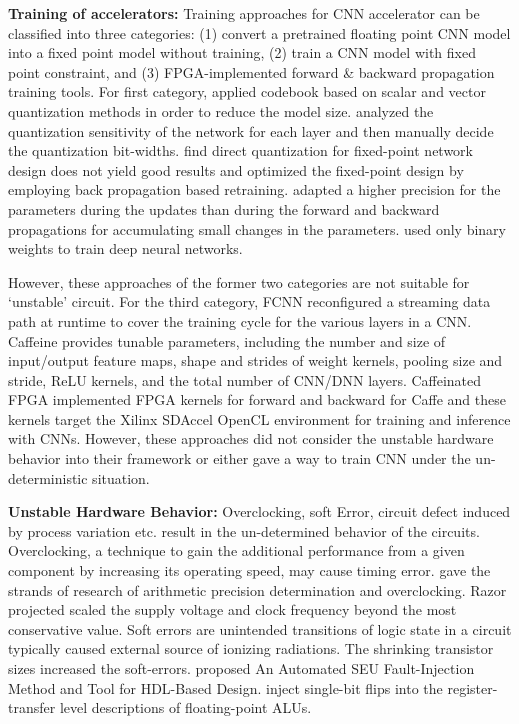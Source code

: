 \textbf{Training of accelerators:} Training approaches for CNN accelerator can be classified into three 
categories: (1) convert a pretrained floating point CNN model into a fixed point model without 
training, (2) train a CNN model with fixed point constraint, and (3) FPGA-implemented forward \& backward propagation 
training tools. For first category, \cite{Yunchao_19} applied codebook based on scalar and vector quantization methods 
in order to reduce the model size. \cite{Cnvlutin_25} analyzed the quantization sensitivity of the network for each layer 
and then manually decide the quantization bit-widths. \cite{Hwang2014_17} find direct quantization for fixed-point 
network design does not yield good results and optimized the fixed-point design by employing back propagation 
based retraining. \cite{Matthieu2014_8} adapted a higher precision for the parameters during the updates than during 
the forward and backward propagations for accumulating small changes in the parameters. \cite{Hwang2014_17} used only binary 
weights to train deep neural networks. 

  However, these approaches of the former two categories are not suitable for ‘unstable’ circuit. 
For the third category, FCNN\cite{fcnn_5}  reconfigured a streaming data path at runtime to cover the training cycle 
for the various layers in a CNN. Caffeine\cite{Caffeine_6}  provides tunable parameters, including the number and 
size of input/output feature maps, shape and strides of weight kernels, pooling size and stride, 
ReLU kernels, and the total number of CNN/DNN layers. Caffeinated FPGA\cite{DiCecco_4} implemented FPGA kernels 
for forward and backward for Caffe and these kernels target the Xilinx SDAccel OpenCL environment 
for training and inference with CNNs. However, these approaches did not consider the unstable 
hardware behavior into their framework or either gave a way to train CNN under the un-deterministic situation.

\textbf{Unstable Hardware Behavior:} Overclocking, soft Error, circuit defect induced by process 
variation etc. result in the un-determined behavior of the circuits.  Overclocking, a technique to gain 
the additional performance from a given component by increasing its operating speed, may cause timing error. \cite{overclock_3} gave 
the strands of research of arithmetic precision determination and overclocking. Razor\cite{Razor_15}  projected scaled 
the supply voltage and clock frequency beyond the most conservative value. Soft errors are unintended 
transitions of logic state in a circuit typically caused external source of ionizing radiations. 
The shrinking transistor sizes increased the soft-errors. \cite{Mansour_20} proposed An Automated SEU 
Fault-Injection Method and Tool for HDL-Based Design. \cite{Subasi_30} inject single-bit flips into the register-transfer 
level descriptions of floating-point ALUs.

